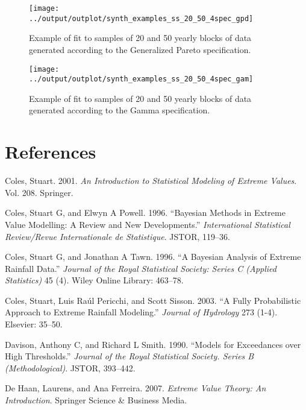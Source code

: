 \documentclass[]{article}
\begin{document}
\begin{figure}
\texttt{[image: ../output/outplot/synth\_examples\_ss\_20\_50\_4spec\_gpd]} \caption{Example of fit to samples of 20 and 50 yearly blocks of data generated according to the Generalized Pareto specification.\label{fig:gpd_spec}}\label{fig:gam}
\end{figure}

\begin{figure}
\texttt{[image: ../output/outplot/synth\_examples\_ss\_20\_50\_4spec\_gam]} \caption{Example of fit to samples of 20 and 50 yearly blocks of data generated according to the Gamma specification.\label{fig:gam_spec}}\label{fig:gpd}
\end{figure}

\hypertarget{references}{%
\section*{References}\label{references}}

\hypertarget{refs}{}
\leavevmode\hypertarget{ref-coles2001introduction}{}%
Coles, Stuart. 2001. \emph{An Introduction to Statistical Modeling of
Extreme Values}. Vol. 208. Springer.

\leavevmode\hypertarget{ref-coles1996bayesian2}{}%
Coles, Stuart G, and Elwyn A Powell. 1996. ``Bayesian Methods in Extreme
Value Modelling: A Review and New Developments.'' \emph{International
Statistical Review/Revue Internationale de Statistique}. JSTOR, 119--36.

\leavevmode\hypertarget{ref-coles1996bayesian}{}%
Coles, Stuart G, and Jonathan A Tawn. 1996. ``A Bayesian Analysis of
Extreme Rainfall Data.'' \emph{Journal of the Royal Statistical Society:
Series C (Applied Statistics)} 45 (4). Wiley Online Library: 463--78.

\leavevmode\hypertarget{ref-coles2003fully}{}%
Coles, Stuart, Luis Raúl Pericchi, and Scott Sisson. 2003. ``A Fully
Probabilistic Approach to Extreme Rainfall Modeling.'' \emph{Journal of
Hydrology} 273 (1-4). Elsevier: 35--50.

\leavevmode\hypertarget{ref-davison1990models}{}%
Davison, Anthony C, and Richard L Smith. 1990. ``Models for Exceedances
over High Thresholds.'' \emph{Journal of the Royal Statistical Society.
Series B (Methodological)}. JSTOR, 393--442.

\leavevmode\hypertarget{ref-de2007extreme}{}%
De Haan, Laurens, and Ana Ferreira. 2007. \emph{Extreme Value Theory: An
Introduction}. Springer Science \& Business Media.
\end{document}

